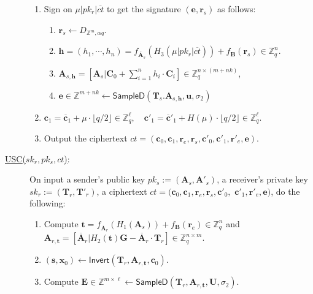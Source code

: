 \documentclass[a4paper,11pt,onecolumn]{elsarticle}
\begin{document}
\begin{description}
\begin{enumerate}
					\item Sign on $\mu| pk_r|\overline{ct}$ to get the signature $(\textbf{e}, \textbf{r}_s )$ as follows:
					\begin{enumerate}
					\item  $ \textbf{r}_s \leftarrow D_{\mathbb{Z}^{m }, \alpha q}$.
					\item $\textbf{h}=(h_1, \cdots, h_n)=f_{\overline{\textbf{A}}_s}(H_3(\mu| pk_r|\overline{ct}))+f_{\textbf{B}}(\textbf{r}_s)\in \mathbb{Z}_q^{n}$.
					\item $\textbf{A}_{s,\textbf{h}}=[\mathbf{A}_s|\mathbf{C}_0+\sum_{i=1}^{n}h_i\cdot \mathbf{C}_i]\in \mathbb{Z}_q^{n \times (m+nk)}$,
					\item $\textbf{e} \in \mathbb{Z}^{m+nk} \leftarrow \textsf{SampleD}(\textbf{T}_s. \textbf{A}_{s,\textbf{h}},\textbf{u},\sigma_2)$
				
					\end{enumerate}
			\item     $\textbf{c}_1=\overline{\textbf{c}}_1+ \mu \cdot \lfloor q/2\rfloor \in \mathbb{Z}_q^{\ell}, \quad \textbf{c}'_1=\overline{\textbf{c}}'_1+ H(\mu) \cdot \lfloor q/2\rfloor \in \mathbb{Z}_q^{\ell}$.
			\item Output the ciphertext $ct=(\textbf{c}_0, \textbf{c}_1, \textbf{r}_e,\textbf{r}_s,\textbf{c}'_0, \textbf{c}'_1,\textbf{r}'_e,   \textbf{e})$.
				\end{enumerate}
	
		
		
	\item[ \underline{\textsf{USC}($sk_r, pk_s,ct$)}:] On input a sender's public key  $ pk_s:=(\mathbf{A}_s, \mathbf{A}'_s)$, a receiver's private key $sk_r:=(\textbf{T}_r, \textbf{T}'_r)$, a ciphertext  $ct=(\textbf{c}_0, \textbf{c}_1, \textbf{r}_e,\textbf{r}_s,\textbf{c}'_0,$ $ \textbf{c}'_1,\textbf{r}'_e,   \textbf{e})$, do the following:
			\begin{enumerate}
	
				\item Compute  $\textbf{t}=f_{\overline{\textbf{A}}_r}(H_1(\textbf{A}_s))+f_{\textbf{B}}(\textbf{r}_e)\in \mathbb{Z}_q^{n}$ and  $\textbf{A}_{r,\textbf{t}}=[\overline{\mathbf{A}}_r|H_2(\textbf{t})\mathbf{G}-\overline{\mathbf{A}}_r\cdot \mathbf{T}_r]\in \mathbb{Z}_q^{n \times m}$.
				\item $(\textbf{s},\textbf{x}_0) \leftarrow \textsf{Invert}(\textbf{T}_r,\textbf{A}_{r,\textbf{t}}, \textbf{c}_0)$.
				\item Compute $\textbf{E} \in \mathbb{Z}^{m\times \ell} \leftarrow \textsf{SampleD}(\textbf{T}_r, \textbf{A}_{r,\textbf{t}},\textbf{U},\sigma_2)$.
				

\end{enumerate}
\end{description}
\end{document}
